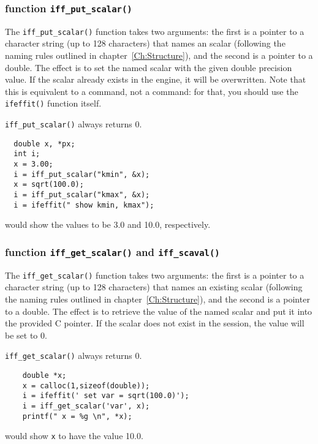 \subsubsection{function {\tt{iff\_put\_scalar()}}}\label{Ch:Scripting-cc:putscalar}

{} The {\tt{iff\_put\_scalar()}} function
takes two arguments: the first is a pointer to a character string (up to
128 characters) that names an {\ifeffit} scalar (following the naming rules
outlined in chapter~\ref{Ch:Structure}), and the second is a pointer to a
double.  The effect is to set the named scalar with the given double
precision value.  If the scalar already exists in the {\ifeffit} engine, it
will be overwritten.  Note that this is equivalent to a {}
command, not a {} command: for that, you should use the
{\tt{ifeffit()}} function itself.

{\tt{iff\_put\_scalar()}} always returns 0.

\begin{verbatim}
  double x, *px;
  int i;
  x = 3.00;
  i = iff_put_scalar("kmin", &x);
  x = sqrt(100.0);
  i = iff_put_scalar("kmax", &x);
  i = ifeffit(" show kmin, kmax");
\end{verbatim}
\noindent
would show the values to be 3.0 and 10.0, respectively.

\subsubsection{function {\tt{iff\_get\_scalar()}} and {\tt{iff\_scaval()}}
}\label{Ch:Scripting-cc:getscalar}

{}
The {\tt{iff\_get\_scalar()}} function takes two arguments: the first is a
pointer to a character string (up to 128 characters) that names an existing
{\ifeffit} scalar (following the naming rules outlined in
chapter~\ref{Ch:Structure}), and the second is a pointer to a double.
The effect is to retrieve the value of the named {\ifeffit} scalar and put
it into the provided C pointer.  If the scalar does not exist in the
{\ifeffit} session, the value will be set to 0.

{\tt{iff\_get\_scalar()}} always returns 0.

\begin{verbatim}
    double *x;
    x = calloc(1,sizeof(double)); 
    i = ifeffit(' set var = sqrt(100.0)');
    i = iff_get_scalar('var', x);
    printf(" x = %g \n", *x);
\end{verbatim}
\noindent
would show {\tt{x}} to have the value 10.0.

